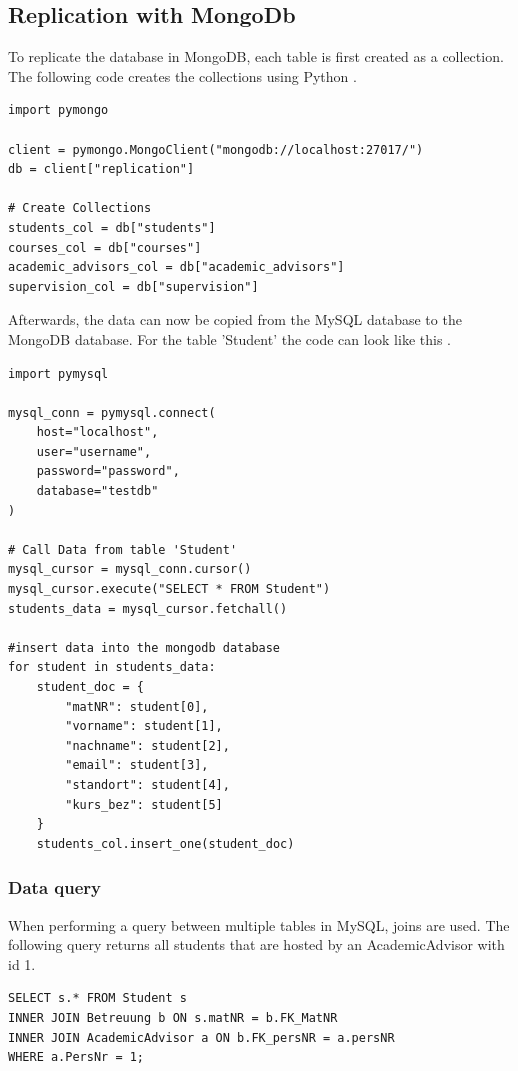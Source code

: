 \subsection{Replication with MongoDb}

To replicate the database in MongoDB, each table is first created as a collection. The following code creates the collections using Python \parencite{mujdrica_pymongo}.

\begin{verbatim}
import pymongo

client = pymongo.MongoClient("mongodb://localhost:27017/")
db = client["replication"]

# Create Collections
students_col = db["students"]
courses_col = db["courses"]
academic_advisors_col = db["academic_advisors"]
supervision_col = db["supervision"]
\end{verbatim}

Afterwards, the data can now be copied from the MySQL database to the MongoDB database. For the table 'Student' the code can look like this \parencite{mujdrica_mysqldriver}.

\begin{verbatim}
import pymysql

mysql_conn = pymysql.connect(
    host="localhost",
    user="username",
    password="password",
    database="testdb"
)

# Call Data from table 'Student'
mysql_cursor = mysql_conn.cursor()
mysql_cursor.execute("SELECT * FROM Student")
students_data = mysql_cursor.fetchall()

#insert data into the mongodb database
for student in students_data:
    student_doc = {
        "matNR": student[0],
        "vorname": student[1],
        "nachname": student[2],
        "email": student[3],
        "standort": student[4],
        "kurs_bez": student[5]
    }
    students_col.insert_one(student_doc)
\end{verbatim}

\subsubsection{Data query}

When performing a query between multiple tables in MySQL, joins are used. The following query returns all students that are hosted by an AcademicAdvisor with id 1.

\begin{verbatim}
SELECT s.* FROM Student s
INNER JOIN Betreuung b ON s.matNR = b.FK_MatNR
INNER JOIN AcademicAdvisor a ON b.FK_persNR = a.persNR
WHERE a.PersNr = 1;
\end{verbatim}

